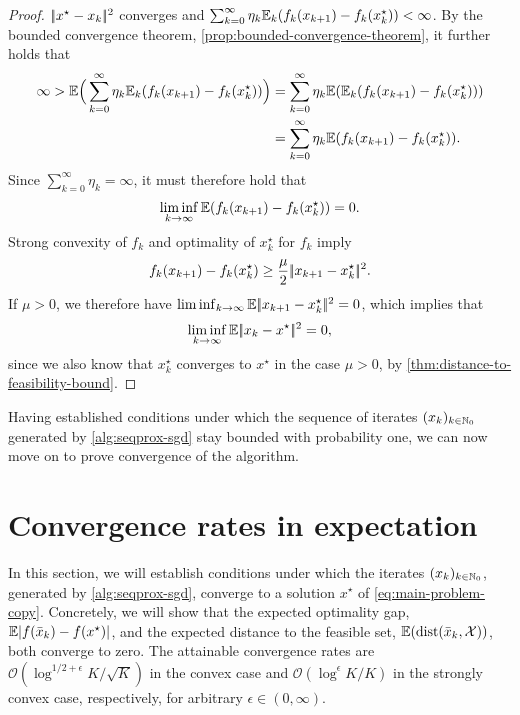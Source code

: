 \begin{proof}
    $|\!|x^\star - x_{k}|\!|^2$ converges and
    $\sum_{k=0}^\infty \eta_k\mathbb{E}_k(f_{k}(x_{k+1}) - f_{k}(x_k^\star)) < \infty$.
    By the bounded convergence theorem, \cref{prop:bounded-convergence-theorem}, it further holds that
    \begin{align*}
        \infty > \mathbb{E}\Big( \sum_{k=0}^\infty \eta_k\mathbb{E}_k(f_{k}(x_{k+1}) - f_{k}(x_k^\star)) \Big)
        &=
        \sum_{k=0}^\infty \eta_k\mathbb{E}(\mathbb{E}_k(f_{k}(x_{k+1}) - f_{k}(x_k^\star))) \\
        &=
        \sum_{k=0}^\infty \eta_k\mathbb{E}(f_{k}(x_{k+1}) - f_{k}(x_k^\star)).
    \end{align*}
    Since $\sum_{k=0}^\infty \eta_k = \infty$, it must therefore hold that
    \[
        \liminf_{k\to\infty} \mathbb{E}(f_{k}(x_{k+1}) - f_{k}(x_k^\star)) = 0.
    \]
    Strong convexity of $f_k$ and optimality of $x_k^\star$ for $f_k$ imply
    \[
        f_{k}(x_{k+1}) - f_{k}(x_k^\star) \geq \frac{\mu}{2} |\!|x_{k+1} - x_k^\star|\!|^2.
    \]
    If $\mu > 0$, we therefore have $\liminf_{k\to\infty} \mathbb{E}|\!|x_{k+1} - x_k^\star|\!|^2 = 0$,
    which implies that
    \[
        \liminf_{k\to\infty} \mathbb{E}|\!|x_{k} - x^\star|\!|^2 = 0,
    \]
    since we also know that $x_k^\star$ converges to $x^\star$
    in the case $\mu > 0$, by \cref{thm:distance-to-feasibility-bound}.
\end{proof}

Having established conditions under which the sequence of iterates $(x_k)_{k\in\mathbb{N}_0}$ generated
by \cref{alg:seqprox-sgd} stay bounded with probability one, we can now move on to
prove convergence of the algorithm.

\section{Convergence rates in expectation}
\label{sec:convergence-in-expectation}

In this section, we will establish conditions under which the
iterates $(x_k)_{k\in\mathbb{N}_0}$, generated
by \cref{alg:seqprox-sgd}, converge to a solution $x^\star$  of \eqref{eq:main-problem-copy}.
Concretely, we will show that the expected optimality gap, $\mathbb{E}|f(\bar{x}_k) - f(x^\star)|$, and
the expected distance to the feasible set, $\mathbb{E}(\operatorname{dist}(\bar{x}_k, \mathcal{X}))$, both converge
to zero. The attainable convergence rates are
$\mathcal{O}(\log^{1/2+\epsilon} K / \sqrt{K})$ in the convex case and $\mathcal{O}(\log^\epsilon K / K)$
in the strongly convex case, respectively, for arbitrary $\epsilon\in(0,\infty)$.

